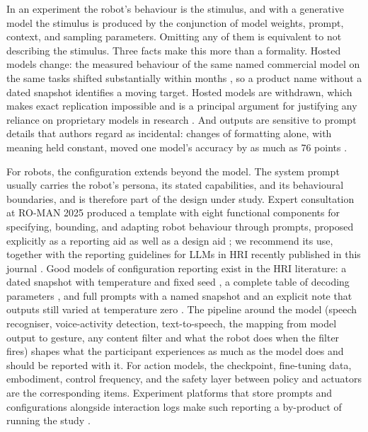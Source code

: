 In an experiment the robot's behaviour is the stimulus, and with a generative
model the stimulus is produced by the conjunction of model weights, prompt,
context, and sampling parameters. Omitting any of them is equivalent to not
describing the stimulus. Three facts make this more than a formality. Hosted
models change: the measured behaviour of the same named commercial model on
the same tasks shifted substantially within months \cite{chen2024how}, so a
product name without a dated snapshot identifies a moving target. Hosted
models are withdrawn, which makes exact replication impossible and is a
principal argument for justifying any reliance on proprietary models in
research \cite{palmer2024using,ollion2024dangers,rogers2023closed}. And
outputs are sensitive to prompt details that authors regard as incidental:
changes of formatting alone, with meaning held constant, moved one model's
accuracy by as much as 76 points \cite{sclar2024quantifying}.

For robots, the configuration extends beyond the model. The system prompt
usually carries the robot's persona, its stated capabilities, and its
behavioural boundaries, and is therefore part of the design under study.
Expert consultation at RO-MAN 2025 produced a template with eight functional
components for specifying, bounding, and adapting robot behaviour through
prompts, proposed explicitly as a reporting aid as well as a design aid
\cite{ashok2026why}; we recommend its use, together with the reporting
guidelines for LLMs in HRI recently published in this journal
\cite{matuszek2026reporting}. Good models of configuration reporting exist
in the HRI literature: a dated snapshot with temperature and fixed seed
\cite{tanneberg2024help}, a complete table of decoding parameters
\cite{mishra2023realtime}, and full prompts with a named snapshot and an
explicit note that outputs still varied at temperature zero
\cite{mahadevan2024generative}. The pipeline around the model
(speech recogniser, voice-activity detection, text-to-speech, the mapping from
model output to gesture, any content filter and what the robot does when the
filter fires) shapes what the participant experiences as much as the model
does and should be reported with it. For action models, the checkpoint,
fine-tuning data, embodiment, control frequency, and the safety layer between
policy and actuators are the corresponding items. Experiment platforms that
store prompts and configurations alongside interaction logs make such
reporting a by-product of running the study \cite{laban2024lexi}.

